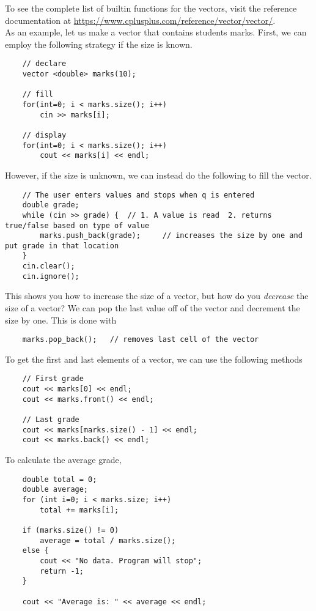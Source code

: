 \documentclass[]{article}
\begin{document}
To see the complete list of builtin functions for the vectors, visit the reference documentation at \url{https://www.cplusplus.com/reference/vector/vector/}.\\

As an example, let us make a vector that contains students marks. First, we can employ the following strategy if the size is known.

\begin{lstlisting}
	// declare
	vector <double> marks(10);
	
	// fill
	for(int=0; i < marks.size(); i++)
		cin >> marks[i];
	
	// display
	for(int=0; i < marks.size(); i++)
		cout << marks[i] << endl;
\end{lstlisting}\bigbreak

However, if the size is unknown, we can instead do the following to fill the vector.

\begin{lstlisting}
	// The user enters values and stops when q is entered
	double grade;
	while (cin >> grade) {	// 1. A value is read  2. returns true/false based on type of value
		marks.push_back(grade);		// increases the size by one and put grade in that location 
	}
	cin.clear();
	cin.ignore();
\end{lstlisting}\bigbreak

This shows you how to increase the size of a vector, but how do you \textit{decrease} the size of a vector? We can pop the last value off of the vector and decrement the size by one. This is done with

\begin{lstlisting}
	marks.pop_back();	// removes last cell of the vector
\end{lstlisting}\bigbreak

To get the first and last elements of a vector, we can use the following methods

\begin{lstlisting}
	// First grade
	cout << marks[0] << endl;
	cout << marks.front() << endl;
	
	// Last grade
	cout << marks[marks.size() - 1] << endl;
	cout << marks.back() << endl;
\end{lstlisting}\bigbreak 


To calculate the average grade,

\begin{lstlisting}
	double total = 0;
	double average;
	for (int i=0; i < marks.size; i++)
		total += marks[i];
	
	if (marks.size() != 0)
		average = total / marks.size();
	else {
		cout << "No data. Program will stop";
		return -1;
	}

	cout << "Average is: " << average << endl;
\end{lstlisting}\bigbreak
\end{document}

